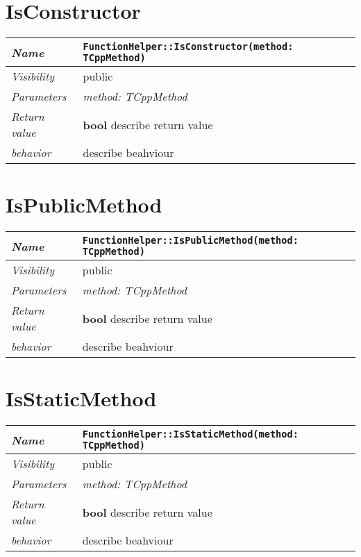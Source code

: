  \section{IsConstructor}
\begin{longtable}{p{3cm} @{\hskip 1cm} p{12cm}}
 \hline
\textit{Name} & \texttt{FunctionHelper::IsConstructor(method: TCppMethod)}\\
\hline
 \textit{Visibility} & public\\
\hline
\textit{Parameters} & \textit{method: TCppMethod}\\
\hline
\textit{Return value} & \textbf{ bool} describe return value\\
  \hline
 \textit{behavior} & describe beahviour \\
\hline
\end{longtable} \pagebreak
 \section{IsPublicMethod}
\begin{longtable}{p{3cm} @{\hskip 1cm} p{12cm}}
 \hline
\textit{Name} & \texttt{FunctionHelper::IsPublicMethod(method: TCppMethod)}\\
\hline
 \textit{Visibility} & public\\
\hline
\textit{Parameters} & \textit{method: TCppMethod}\\
\hline
\textit{Return value} & \textbf{ bool} describe return value\\
  \hline
 \textit{behavior} & describe beahviour \\
\hline
\end{longtable} \pagebreak
 \section{IsStaticMethod}
\begin{longtable}{p{3cm} @{\hskip 1cm} p{12cm}}
 \hline
\textit{Name} & \texttt{FunctionHelper::IsStaticMethod(method: TCppMethod)}\\
\hline
 \textit{Visibility} & public\\
\hline
\textit{Parameters} & \textit{method: TCppMethod}\\
\hline
\textit{Return value} & \textbf{ bool} describe return value\\
  \hline
 \textit{behavior} & describe beahviour \\
\hline
\end{longtable} \pagebreak

